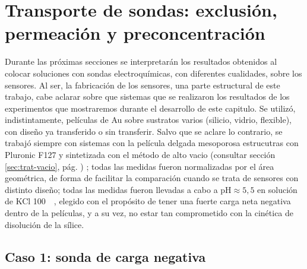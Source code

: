 	
				

\section{Transporte de sondas: exclusión, permeación y preconcentración}

	Durante las próximas secciones se interpretarán los resultados obtenidos al colocar soluciones con sondas electroquímicas, con diferentes cualidades, sobre los sensores. Al ser, la fabricación de los sensores, una parte estructural de este trabajo, cabe aclarar sobre que sistemas que se realizaron los resultados de los experimentos que mostraremos durante el desarrollo de este capitulo. Se utilizó, indistintamente, películas de Au sobre sustratos varios (silicio, vidrio, flexible), con diseño ya transferido o sin transferir. Salvo que se aclare lo contrario, se trabajó siempre con sistemas con la película delgada mesoporosa estrucutras con Pluronic F127 y sintetizada con el método de alto vacio (consultar sección \ref{sec:trat-vacio}, pág. \pageref{sec:trat-vacio}) ; todas las medidas fueron normalizadas por el área geométrica, de forma de facilitar la comparación cuando se trata de sensores con distinto diseño; todas las medidas fueron llevadas a cabo a $\text{pH}\approx5,5$ en solución de KCl \SI{100}{\milli\Molar}, elegido con el propósito de tener una fuerte carga neta negativa dentro de la películas, y a su vez, no estar tan comprometido con la cinética de disolución de la sílice.

	\subsection{Caso 1: sonda de carga negativa}

